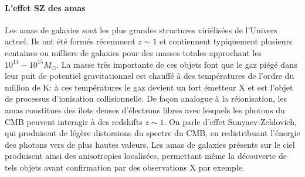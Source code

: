 \paragraph{L'effet SZ des amas}
Les amas de galaxies sont les plus grandes structures viriélisées de l'Univers actuel. Ils ont été formés récemment $z\sim 1$ et contiennent typiquement plusieurs centaines ou milliers de galaxies pour des masses totales approchant les $10^{14}-10^{15} M_\odot$. La masse très importante de ces objets font que le gaz piégé dans leur puit de potentiel gravitationnel est chauffé à des températures de l'ordre du million de K: à ces températures le gaz devient un fort émetteur X et est l'objet de processus d'ionisation collisionnelle. De façon analogue à la réionisation, les amas constitues des ilots denses d'électrons libres avec lesquels les photons du CMB peuvent interagir à des redshifts $z\sim 1$. On parle d'effet Sunyaev-Zeldovich, qui produisent de légère distorsions du spectre du CMB, en redistribuant l'énergie des photons vers de plus hautes valeurs. Les amas de galaxies présents sur le ciel produisent ainsi des anisotropies localisées, permettant même la découverte de tels objets avant confirmation par des observations X par exemple.

